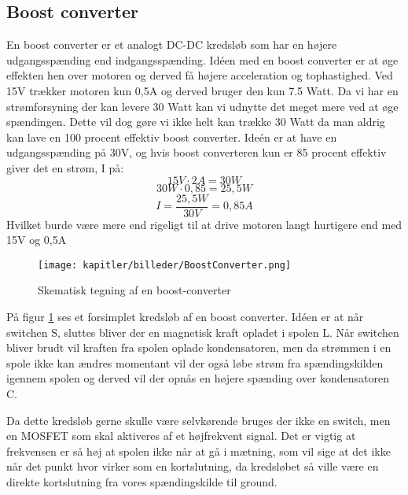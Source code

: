 \newpage
\subsection{Boost converter}
En boost converter er et analogt DC-DC kredsløb som har en højere udgangsspænding end indgangsspænding.
Idéen med en boost converter er at øge effekten hen over motoren og derved få højere acceleration og tophastighed. Ved 15V trækker motoren kun 0,5A og derved bruger den kun 7.5 Watt. Da vi har en strømforsyning der kan levere 30 Watt kan vi udnytte det meget mere ved at øge spændingen. Dette vil dog gøre vi ikke helt kan trække 30 Watt da man aldrig kan lave en 100 procent effektiv boost converter.  Ideén er at have en udgangsspænding på 30V, og hvis boost converteren kun er 85 procent effektiv giver det en strøm, I på:
\begin{equation}
15V \cdot 2A = 30 W
\end{equation}
\begin{equation}
30 W \cdot 0,85 = 25,5 W
\end{equation}
\begin{equation}
I = \frac{25,5 W}{30 V} = 0,85A
\end{equation}
Hvilket burde være mere end rigeligt til at drive motoren langt hurtigere end med 15V og 0,5A

\begin{figure}[ht]
    \centering
    \texttt{[image: kapitler/billeder/BoostConverter.png]}
    \caption{Skematisk tegning af en boost-converter}
    \label{fig:boostconvert}
\end{figure}

På figur \ref{fig:boostconvert} ses et forsimplet kredsløb af en boost converter. Idéen er at når switchen S, sluttes bliver der en magnetisk kraft opladet i spolen L. Når switchen bliver brudt vil kraften fra spolen oplade kondensatoren, men da strømmen i en spole ikke kan ændres momentant vil der også løbe strøm fra spændingskilden igennem spolen og derved vil der opnås en højere spænding over kondensatoren C.

Da dette kredsløb gerne skulle være selvkørende bruges der ikke en switch, men en MOSFET som skal aktiveres af et højfrekvent signal. Det er vigtig at frekvensen er så høj at spolen ikke når at gå i mætning, som vil sige at det ikke når det punkt hvor virker som en kortslutning, da kredsløbet så ville være en direkte kortslutning fra vores spændingskilde til ground.


